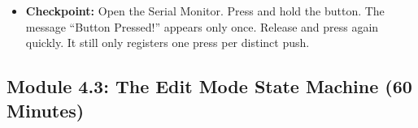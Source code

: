 \documentclass[11pt,a4paper]{article}
\begin{document}
\begin{itemize}
\begin{lstlisting}[caption={Code for Module 4.2: A Robust Button Handler}]
  // Save the current state for the next loop iteration.
  last_btn_state = current_reading;
}

void loop() {
  // In the main loop, you just call your button checker.
  // It doesn't block the rest of your code.
  check_button();
  // Your multiplexing code would also go here.
}
\end{lstlisting}
    \item \textbf{Checkpoint:} Open the Serial Monitor. Press and hold the button. The message ``Button Pressed!'' appears only once. Release and press again quickly. It still only registers one press per distinct push.
\end{itemize}
\newpage
\subsection*{Module 4.3: The Edit Mode State Machine (60 Minutes)}
\end{document}
